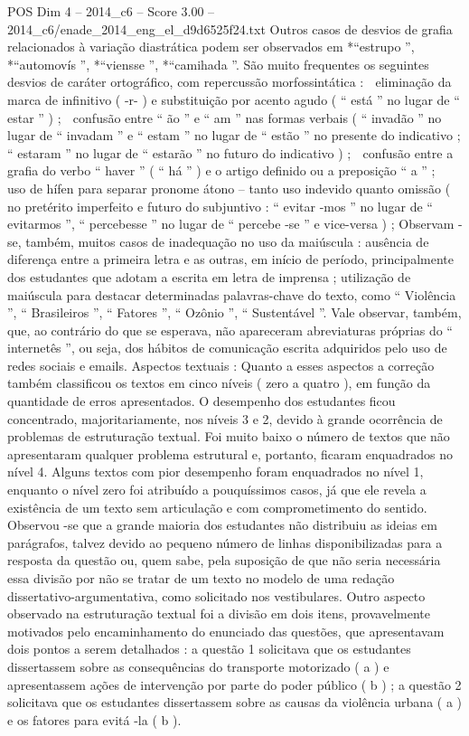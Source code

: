 \begin{textsample}{POS Dim 4 – 2014\_c6 – Score 3.00 – 2014\_c6/enade\_2014\_eng\_el\_d9d6525f24.txt}
Outros casos de desvios de grafia relacionados à variação diastrática podem ser observados em *“estrupo ”, *“automovís ”, *“viensse ”, *“camihada ”.
São muito frequentes os seguintes desvios de caráter ortográfico, com repercussão morfossintática :  eliminação da marca de infinitivo ( -r- ) e substituição por acento agudo ( “ está ” no lugar de “ estar ” ) ;  confusão entre “ ão ” e “ am ” nas formas verbais ( “ invadão ” no lugar de “ invadam ” e “ estam ” no lugar de “ estão ” no presente do indicativo ; “ estaram ” no lugar de “ estarão ” no futuro do indicativo ) ;  confusão entre a grafia do verbo “ haver ” ( “ há ” ) e o artigo definido ou a preposição “ a ” ;  uso de hífen para separar pronome átono – tanto uso indevido quanto omissão ( no pretérito imperfeito e futuro do subjuntivo : “ evitar -mos ” no lugar de “ evitarmos ”, “ percebesse ” no lugar de “ percebe -se ” e vice-versa ) ; Observam -se, também, muitos casos de inadequação no uso da maiúscula : ausência de diferença entre a primeira letra e as outras, em início de período, principalmente dos estudantes que adotam a escrita em letra de imprensa ; utilização de maiúscula para destacar determinadas palavras-chave do texto, como “ Violência ”, “ Brasileiros ”, “ Fatores ”, “ Ozônio ”, “ Sustentável ”.
Vale observar, também, que, ao contrário do que se esperava, não apareceram abreviaturas próprias do “ internetês ”, ou seja, dos hábitos de comunicação escrita adquiridos pelo uso de redes sociais e emails.
Aspectos textuais : Quanto a esses aspectos a correção também classificou os textos em cinco níveis ( zero a quatro ), em função da quantidade de erros apresentados.
O desempenho dos estudantes ficou concentrado, majoritariamente, nos níveis 3 e 2, devido à grande ocorrência de problemas de estruturação textual.
Foi muito baixo o número de textos que não apresentaram qualquer problema estrutural e, portanto, ficaram enquadrados no nível 4.
Alguns textos com pior desempenho foram enquadrados no nível 1, enquanto o nível zero foi atribuído a pouquíssimos casos, já que ele revela a existência de um texto sem articulação e com comprometimento do sentido.
Observou -se que a grande maioria dos estudantes não distribuiu as ideias em parágrafos, talvez devido ao pequeno número de linhas disponibilizadas para a resposta da questão ou, quem sabe, pela suposição de que não seria necessária essa divisão por não se tratar de um texto no modelo de uma redação dissertativo-argumentativa, como solicitado nos vestibulares.
Outro aspecto observado na estruturação textual foi a divisão em dois itens, provavelmente motivados pelo encaminhamento do enunciado das questões, que apresentavam dois pontos a serem detalhados : a questão 1 solicitava que os estudantes dissertassem sobre as consequências do transporte motorizado ( a ) e apresentassem ações de intervenção por parte do poder público ( b ) ; a questão 2 solicitava que os estudantes dissertassem sobre as causas da violência urbana ( a ) e os fatores para evitá -la ( b ).

\end{textsample}
